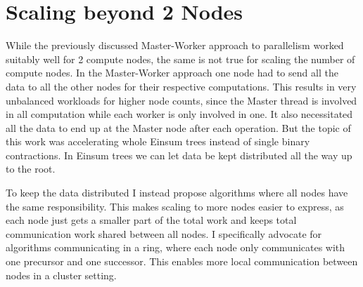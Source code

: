 
\section{Scaling beyond 2 Nodes}

While the previously discussed Master-Worker approach to parallelism worked suitably well for 2 compute nodes, the same is not true for scaling the number of compute nodes.
In the Master-Worker approach one node had to send all the data to all the other nodes for their respective computations.
This results in very unbalanced workloads for higher node counts, since the Master thread is involved in all computation while each worker is only involved in one.
It also necessitated all the data to end up at the Master node after each operation.
But the topic of this work was accelerating whole Einsum trees instead of single binary contractions.
In Einsum trees we can let data be kept distributed all the way up to the root.

To keep the data distributed I instead propose algorithms where all nodes have the same responsibility.
This makes scaling to more nodes easier to express, as each node just gets a smaller part of the total work and keeps total communication work shared between all nodes.
I specifically advocate for algorithms communicating in a ring, where each node only communicates with one precursor and one successor.
This enables more local communication between nodes in a cluster setting.

